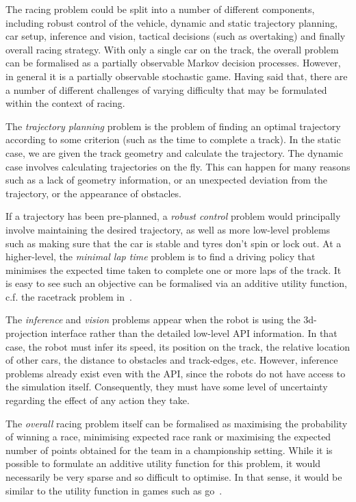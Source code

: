 \documentclass[a4paper]{article}
\begin{document}
The racing problem could be split into a number of different components, including robust control of the vehicle, dynamic and static trajectory planning, car setup, inference and vision, tactical decisions (such as overtaking) and finally overall racing strategy. With only a single car on the track, the overall problem can be formalised as a partially observable Markov decision processes. However, in general it is a partially observable stochastic game. Having said that, there are a number of different challenges of varying difficulty that may be formulated within the context of racing.

The \emph{trajectory planning} problem is the problem of finding an optimal trajectory according to some criterion (such as the time to complete a track). In the static case, we are given the track geometry and calculate the trajectory. The dynamic case involves calculating trajectories on the fly. This can happen for many reasons such as a lack of geometry information,  or an unexpected deviation from the trajectory, or the appearance of obstacles. 

If a trajectory has been pre-planned, a \emph{robust control} problem would principally involve maintaining the desired trajectory, as well as more low-level problems such as making sure that the car is stable and tyres don't spin or lock out. At a higher-level, the \emph{minimal lap time} problem is to find a driving policy that minimises the expected time taken to complete one or more laps of the track. It is easy to see such an objective can be formalised via an additive utility function, c.f. the racetrack problem in~\cite{Sutton+Barto:1998}.

The \emph{inference} and \emph{vision} problems appear when the robot is using the 3d-projection interface rather than the detailed low-level API information. In that case, the robot must infer its speed, its position on the track, the relative location of other cars, the distance to obstacles and track-edges, etc. However, inference problems already exist even with the API, since the robots do not have access to the simulation itself. Consequently, they must have some level of uncertainty regarding the effect of any action they take.

The \emph{overall} racing problem itself can be formalised as maximising the probability of winning a race, minimising expected race rank or maximising the expected number of points obtained for the team in a championship setting. While it is possible to formulate an additive utility function for this problem, it would necessarily be very sparse and so difficult to optimise. In that sense, it would be similar to the utility function in games such as go~\cite{gelly:uct-go}.
\end{document}

